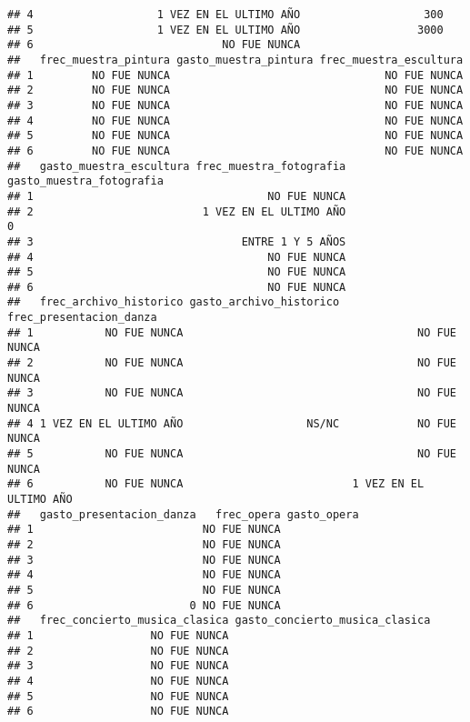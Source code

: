 \documentclass[
]{article}
\begin{document}
\begin{verbatim}
## 4                   1 VEZ EN EL ULTIMO AÑO                   300
## 5                   1 VEZ EN EL ULTIMO AÑO                  3000
## 6                             NO FUE NUNCA                      
##   frec_muestra_pintura gasto_muestra_pintura frec_muestra_escultura
## 1         NO FUE NUNCA                                 NO FUE NUNCA
## 2         NO FUE NUNCA                                 NO FUE NUNCA
## 3         NO FUE NUNCA                                 NO FUE NUNCA
## 4         NO FUE NUNCA                                 NO FUE NUNCA
## 5         NO FUE NUNCA                                 NO FUE NUNCA
## 6         NO FUE NUNCA                                 NO FUE NUNCA
##   gasto_muestra_escultura frec_muestra_fotografia gasto_muestra_fotografia
## 1                                    NO FUE NUNCA                         
## 2                          1 VEZ EN EL ULTIMO AÑO                        0
## 3                                ENTRE 1 Y 5 AÑOS                         
## 4                                    NO FUE NUNCA                         
## 5                                    NO FUE NUNCA                         
## 6                                    NO FUE NUNCA                         
##   frec_archivo_historico gasto_archivo_historico frec_presentacion_danza
## 1           NO FUE NUNCA                                    NO FUE NUNCA
## 2           NO FUE NUNCA                                    NO FUE NUNCA
## 3           NO FUE NUNCA                                    NO FUE NUNCA
## 4 1 VEZ EN EL ULTIMO AÑO                   NS/NC            NO FUE NUNCA
## 5           NO FUE NUNCA                                    NO FUE NUNCA
## 6           NO FUE NUNCA                          1 VEZ EN EL ULTIMO AÑO
##   gasto_presentacion_danza   frec_opera gasto_opera
## 1                          NO FUE NUNCA            
## 2                          NO FUE NUNCA            
## 3                          NO FUE NUNCA            
## 4                          NO FUE NUNCA            
## 5                          NO FUE NUNCA            
## 6                        0 NO FUE NUNCA            
##   frec_concierto_musica_clasica gasto_concierto_musica_clasica
## 1                  NO FUE NUNCA                               
## 2                  NO FUE NUNCA                               
## 3                  NO FUE NUNCA                               
## 4                  NO FUE NUNCA                               
## 5                  NO FUE NUNCA                               
## 6                  NO FUE NUNCA                               

\end{verbatim}
\end{document}
